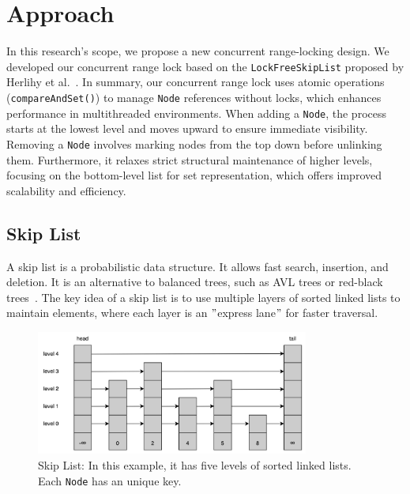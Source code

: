 \chapter{Approach}\label{ch:approach}

In this research's scope, we propose a new concurrent range-locking design. 
We developed our concurrent range lock based on the \texttt{LockFreeSkipList} proposed by Herlihy et al.~\parencite{herlihy2020art}.
In summary, our concurrent range lock uses atomic operations (\texttt{compareAndSet()}) to manage \texttt{Node} references without locks, which enhances performance in multithreaded environments.
When adding a \texttt{Node}, the process starts at the lowest level and moves upward to ensure immediate visibility.
Removing a \texttt{Node} involves marking nodes from the top down before unlinking them.
Furthermore, it relaxes strict structural maintenance of higher levels, focusing on the bottom-level list for set representation, which offers improved scalability and efficiency.

\section{Skip List}\label{sec:skip-list}

A skip list is a probabilistic data structure.
It allows fast search, insertion, and deletion.
It is an alternative to balanced trees, such as AVL trees or red-black trees~\parencite{pugh1990skip, pugh1990skip2}.
The key idea of a skip list is to use multiple layers of sorted linked lists to maintain elements, where each layer is an \("\)express lane\("\) for faster traversal.

\begin{figure}[h]
    \centering
    \includegraphics[width=0.8\textwidth]{./figures/skiplist.png}
    \caption{Skip List: In this example, it has five levels of sorted linked lists. \\
 Each \texttt{Node} has an unique key.}
    \label{fig:skiplist}
\end{figure}

